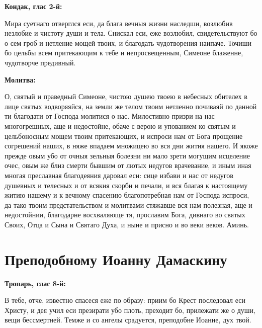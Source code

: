\medskip


\bfseries Кондак, глас 2-й:\normalfont{}\nopagebreak


Мира суетнаго отверглся еси, да блага вечныя жизни наследши, возлюбив незлобие и чистоту души и тела. Снискал еси, еже возлюбил, свидетельствуют бо о сем гроб и нетление мощей твоих, и благодать чудотворения наипаче. Точиши бо цельбы всем притекающим к тебе и непросвещенным, Симеоне блаженне, чудотворче предивный.


\medskip


\bfseries Молитва:\normalfont{}\nopagebreak


О, святый и праведный Симеоне, чистою душею твоею в небесных обителех в лице святых водворяяйся, на земли же телом твоим нетленно почиваяй по данной ти благодати от Господа молитися о нас. Милостивно призри на нас многогрешных, аще и недостойне, обаче с верою и упованием ко святым и цельбоносным мощем твоим притекающих, и испроси нам от Бога прощение согрешений наших, в няже впадаем множицею во вся дни жития нашего. И якоже прежде овым убо от очныя зельныя болезни ни мало зрети могущим исцеление очес, овым же близ смерти бывшим от лютых недугов врачевание, и иным иная многая преславная благодеяния даровал еси: сице избави и нас от недугов душевных и телесных и от всякия скорби и печали, и вся благая к настоящему житию нашему и к вечному спасению благопотребная нам от Господа испроси, да тако твоим предстательством и молитвами стяжавше вся нам полезная, аще и недостойнии, благодарне восхваляюще тя, прославим Бога, дивнаго во святых Своих, Отца и Сына и Святаго Духа, и ныне и присно и во веки веков. Аминь.


\medskip\mychapterending


 

\section{Преподобному Иоанну Дамаскину}
 


\bfseries Тропарь, глас 8-й:\normalfont{}\nopagebreak


В тебе, отче, известно спасеся еже по образу: приим бо Крест последовал еси Христу, и дея учил еси презирати убо плоть, преходит бо, прилежати же о души, вещи бессмертней. Темже и со ангелы срадуется, преподобне Иоанне, дух твой.


